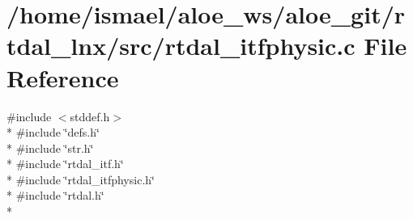 \section{/home/ismael/aloe\-\_\-ws/aloe\-\_\-git/rtdal\-\_\-lnx/src/rtdal\-\_\-itfphysic.c File Reference}
\label{rtdal__itfphysic_8c}
{\ttfamily \#include $<$stddef.\-h$>$}\\*
{\ttfamily \#include \char`\"{}defs.\-h\char`\"{}}\\*
{\ttfamily \#include \char`\"{}str.\-h\char`\"{}}\\*
{\ttfamily \#include \char`\"{}rtdal\-\_\-itf.\-h\char`\"{}}\\*
{\ttfamily \#include \char`\"{}rtdal\-\_\-itfphysic.\-h\char`\"{}}\\*
{\ttfamily \#include \char`\"{}rtdal.\-h\char`\"{}}\\*
